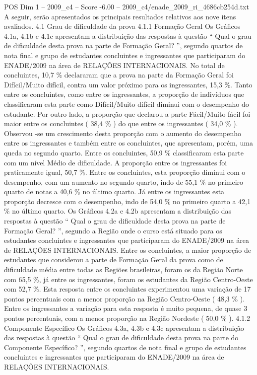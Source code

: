 \begin{textsample}{POS Dim 1 – 2009\_c4 – Score -6.00 – 2009\_c4/enade\_2009\_ri\_4686cb254d.txt}
A seguir, serão apresentados os principais resultados relativos aos nove itens avaliados. 4.1 Grau de dificuldade da prova 4.1.1 Formação Geral Os Gráficos 4.1a, 4.1b e 4.1c apresentam a distribuição das respostas à questão “ Qual o grau de dificuldade desta prova na parte de Formação Geral? ”, segundo quartos de nota final e grupo de estudantes concluintes e ingressantes que participaram do ENADE/2009 na área de RELAÇÕES INTERNACIONAIS.
No total de concluintes, 10,7 \% declararam que a prova na parte da Formação Geral foi Difícil/Muito difícil, contra um valor próximo para os ingressantes, 15,3 \%.
Tanto entre os concluintes, como entre os ingressantes, a proporção de indivíduos que classificaram esta parte como Difícil/Muito difícil diminui com o desempenho do estudante.
Por outro lado, a proporção que declarou a parte Fácil/Muito fácil foi maior entre os concluintes ( 38,4 \% ) do que entre os ingressantes ( 34,0 \% ).
Observou -se um crescimento desta proporção com o aumento do desempenho entre os ingressantes e também entre os concluintes, que apresentam, porém, uma queda no segundo quarto.
Entre os concluintes, 50,9 \% classificaram esta parte com um nível Médio de dificuldade.
A proporção entre os ingressantes foi praticamente igual, 50,7 \%.
Entre os concluintes, esta proporção diminui com o desempenho, com um aumento no segundo quarto, indo de 55,1 \% no primeiro quarto de notas a 40,6 \% no último quarto.
Já entre os ingressantes esta proporção decresce com o desempenho, indo de 54,0 \% no primeiro quarto a 42,1 \% no último quarto.
Os Gráficos 4.2a e 4.2b apresentam a distribuição das respostas à questão “ Qual o grau de dificuldade desta prova na parte de Formação Geral? ”, segundo a Região onde o curso está situado para os estudantes concluintes e ingressantes que participaram do ENADE/2009 na área de RELAÇÕES INTERNACIONAIS.
Entre os concluintes, a maior proporção de estudantes que considerou a parte de Formação Geral da prova como de dificuldade média entre todas as Regiões brasileiras, foram os da Região Norte com 65,5 \%, já entre os ingressantes, foram os estudantes da Região Centro-Oeste com 52,7 \%.
Esta resposta entre os concluintes experimentou uma variação de 17 pontos percentuais com a menor proporção na Região Centro-Oeste ( 48,3 \% ).
Entre os ingressantes a variação para esta resposta é muito pequena, de quase 3 pontos percentuais, com a menor proporção na Região Nordeste ( 50,0 \% ). 4.1.2 Componente Específico Os Gráficos 4.3a, 4.3b e 4.3c apresentam a distribuição das respostas à questão “ Qual o grau de dificuldade desta prova na parte do Componente Específico? ”, segundo quartos de nota final e grupo de estudantes concluintes e ingressantes que participaram do ENADE/2009 na área de RELAÇÕES INTERNACIONAIS.

\end{textsample}
